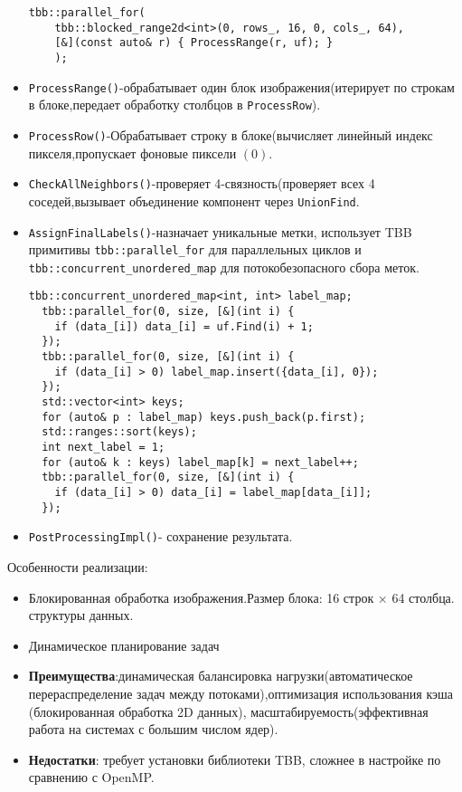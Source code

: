 \documentclass[12pt]{extarticle}
\begin{document}
\begin{itemize}
    \begin{lstlisting}[caption={Разделение изображения на блоки методе ProcessComponents},label={all}]
    tbb::parallel_for(
    tbb::blocked_range2d<int>(0, rows_, 16, 0, cols_, 64),
    [&](const auto& r) { ProcessRange(r, uf); }
    );
    \end{lstlisting}
    \item \texttt{ProcessRange()}-обрабатывает один блок изображения(итерирует по строкам в блоке,передает обработку столбцов в \texttt{ProcessRow}).
    \item \texttt{ProcessRow()}-Обрабатывает строку в блоке(вычисляет линейный индекс пикселя,пропускает фоновые пиксели $(0)$.
    \item \texttt{CheckAllNeighbors()}-проверяет 4-связность(проверяет всех 4 соседей,вызывает объединение компонент через \texttt{UnionFind}.
   \item \texttt{AssignFinalLabels()}-назначает уникальные метки, использует TBB примитивы  \texttt{tbb::parallel\_for} для параллельных циклов и \texttt{tbb::concurrent\_unordered\_map} для потокобезопасного сбора меток.
     \begin{lstlisting}[caption={Параллельная реализация метода AssignFinalLabels},label={all}]
    tbb::concurrent_unordered_map<int, int> label_map;
  tbb::parallel_for(0, size, [&](int i) {
    if (data_[i]) data_[i] = uf.Find(i) + 1;
  });
  tbb::parallel_for(0, size, [&](int i) {
    if (data_[i] > 0) label_map.insert({data_[i], 0});
  });
  std::vector<int> keys;
  for (auto& p : label_map) keys.push_back(p.first);
  std::ranges::sort(keys);
  int next_label = 1;
  for (auto& k : keys) label_map[k] = next_label++;
  tbb::parallel_for(0, size, [&](int i) {
    if (data_[i] > 0) data_[i] = label_map[data_[i]];
  });
\end{lstlisting}
\item \texttt{PostProcessingImpl()}- сохранение результата.
\end{itemize}

Особенности реализации:
\begin{itemize}
    \item Блокированная обработка изображения.Размер блока: 16 строк × 64 столбца.
     структуры данных.
    \item Динамическое планирование задач
    \item \textbf{Преимущества}:динамическая балансировка нагрузки(автоматическое перераспределение задач между потоками),оптимизация использования кэша (блокированная обработка 2D данных), масштабируемость(эффективная работа на системах с большим числом ядер).
    \item \textbf{Недостатки}: требует установки библиотеки TBB, сложнее в настройке по сравнению с OpenMP.
\end{itemize}
\end{document}
